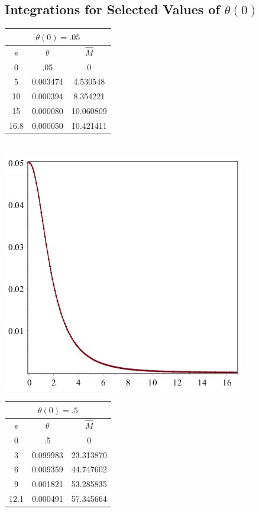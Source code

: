 \documentclass[11pt]{article} %
\begin{document}
\subsection*{Integrations for Selected Values of $\theta(0)$}
\begin{tabular}{ | c c c |}

\multicolumn{3}{c}{ $\theta(0) = .05$ } \\
\hline
s & $\theta$ & $\hat M$\\
\hline
0 & .05 & 0 \\
5 & 0.003474 & 4.530548\\
10 & 0.000394 &8.354221 \\
15 & 0.000080& 10.060809 \\
16.8 & 0.000050& 10.421411\\
\hline
\end{tabular}\\
\includegraphics[scale=.5]{plots/wd1.png}\\
\begin{tabular}{ | c c c |}
\multicolumn{3}{c}{ $\theta(0) = .5$ } \\
\hline
s & $\theta$ & $\hat M$\\
\hline
0 & .5 & 0\\
3 &0.099983 & 23.313870 \\
6 & 0.009359& 44.747602\\
9 & 0.001821& 53.285835\\
12.1 & 0.000491 & 57.345664\\
\hline
\end{tabular}\\
\end{document}
